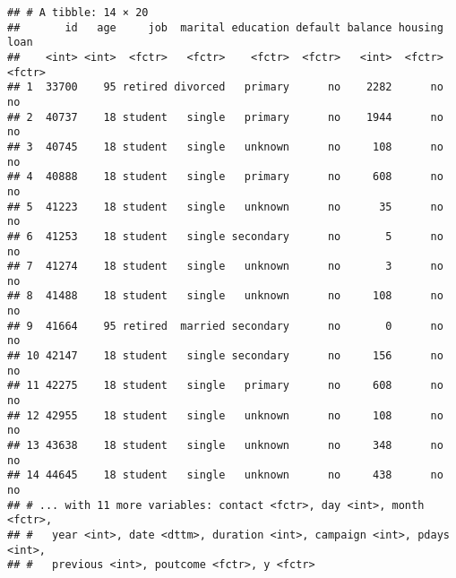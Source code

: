 \documentclass[]{book}
\newenvironment{Shaded}{\begin{snugshade}}{\end{snugshade}}
\newcommand{\KeywordTok}[1]{\textcolor[rgb]{0.13,0.29,0.53}{\textbf{{#1}}}}
\newcommand{\StringTok}[1]{\textcolor[rgb]{0.31,0.60,0.02}{{#1}}}
\newcommand{\CommentTok}[1]{\textcolor[rgb]{0.56,0.35,0.01}{\textit{{#1}}}}
\newcommand{\NormalTok}[1]{{#1}}
\begin{document}
\begin{verbatim}
## # A tibble: 14 × 20
##       id   age     job  marital education default balance housing   loan
##    <int> <int>  <fctr>   <fctr>    <fctr>  <fctr>   <int>  <fctr> <fctr>
## 1  33700    95 retired divorced   primary      no    2282      no     no
## 2  40737    18 student   single   primary      no    1944      no     no
## 3  40745    18 student   single   unknown      no     108      no     no
## 4  40888    18 student   single   primary      no     608      no     no
## 5  41223    18 student   single   unknown      no      35      no     no
## 6  41253    18 student   single secondary      no       5      no     no
## 7  41274    18 student   single   unknown      no       3      no     no
## 8  41488    18 student   single   unknown      no     108      no     no
## 9  41664    95 retired  married secondary      no       0      no     no
## 10 42147    18 student   single secondary      no     156      no     no
## 11 42275    18 student   single   primary      no     608      no     no
## 12 42955    18 student   single   unknown      no     108      no     no
## 13 43638    18 student   single   unknown      no     348      no     no
## 14 44645    18 student   single   unknown      no     438      no     no
## # ... with 11 more variables: contact <fctr>, day <int>, month <fctr>,
## #   year <int>, date <dttm>, duration <int>, campaign <int>, pdays <int>,
## #   previous <int>, poutcome <fctr>, y <fctr>
\end{verbatim}

\begin{Shaded}
\end{Shaded}
\end{document}
